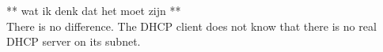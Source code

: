 ** wat ik denk dat het moet zijn ** \\
There is no difference. The DHCP client does not know that there is no real DHCP server on its subnet.

